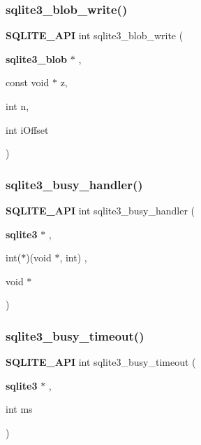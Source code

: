 \mbox{\label{sqlite3_8h_a0dd24c2ce4bfd36279ed96e8266b1d87}} 
\subsubsection{sqlite3\_blob\_write()}
{\footnotesize\ttfamily \textbf{ S\+Q\+L\+I\+T\+E\+\_\+\+A\+PI} int sqlite3\+\_\+blob\+\_\+write (\begin{DoxyParamCaption}\item[{\textbf{ sqlite3\+\_\+blob} $\ast$}]{,  }\item[{const void $\ast$}]{z,  }\item[{int}]{n,  }\item[{int}]{i\+Offset }\end{DoxyParamCaption})}

\mbox{\label{sqlite3_8h_ae27e4c488c7a19f5aed1691eb49b5b00}} 
\subsubsection{sqlite3\_busy\_handler()}
{\footnotesize\ttfamily \textbf{ S\+Q\+L\+I\+T\+E\+\_\+\+A\+PI} int sqlite3\+\_\+busy\+\_\+handler (\begin{DoxyParamCaption}\item[{\textbf{ sqlite3} $\ast$}]{,  }\item[{int($\ast$)(void $\ast$, int)}]{,  }\item[{void $\ast$}]{ }\end{DoxyParamCaption})}

\mbox{\label{sqlite3_8h_afbaab449212d0c2ac951c908f4e37364}} 
\subsubsection{sqlite3\_busy\_timeout()}
{\footnotesize\ttfamily \textbf{ S\+Q\+L\+I\+T\+E\+\_\+\+A\+PI} int sqlite3\+\_\+busy\+\_\+timeout (\begin{DoxyParamCaption}\item[{\textbf{ sqlite3} $\ast$}]{,  }\item[{int}]{ms }\end{DoxyParamCaption})}

